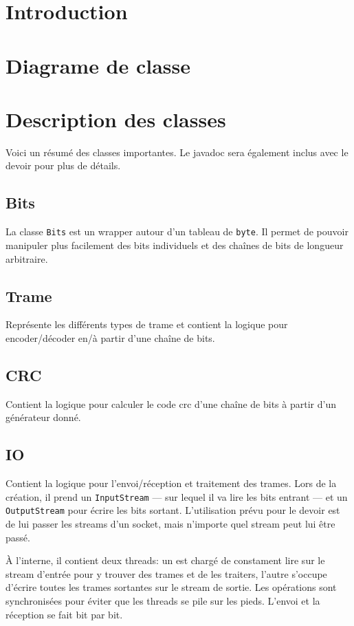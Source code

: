 \documentclass{article}
\begin{document}
\section{Introduction}
\section{Diagrame de classe}

\section{Description des classes}
    Voici un résumé des classes importantes. Le javadoc sera également inclus avec le devoir pour plus de détails.
    
    \subsection{Bits}
    La classe \verb#Bits# est un wrapper autour d'un tableau de \verb#byte#. Il permet de pouvoir manipuler plus facilement des bits individuels et des chaînes de bits de longueur arbitraire.
    
    \subsection{Trame}
    Représente les différents types de trame et contient la logique pour encoder/décoder en/à partir d'une chaîne de bits.
    
    \subsection{CRC}
    Contient la logique pour calculer le code crc d'une chaîne de bits à partir d'un générateur donné.
    
    \subsection{IO}
    Contient la logique pour l'envoi/réception et traitement des trames.
    Lors de la création, il prend un \verb#InputStream# --- sur lequel il va lire les bits entrant --- et un \verb#OutputStream# pour écrire les bits sortant. L'utilisation prévu pour le devoir est de lui passer les streams d'un socket, mais n'importe quel stream peut lui être passé.

    À l'interne, il contient deux threads: un est chargé de constament lire sur le stream d'entrée pour y trouver des trames et de les traiters, l'autre s'occupe d'écrire toutes les trames sortantes sur le stream de sortie. Les opérations sont synchronisées pour éviter que les threads se pile sur les pieds. L'envoi et la réception se fait bit par bit.
\end{document}
